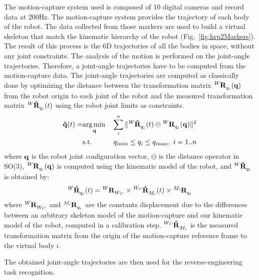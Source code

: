 \documentclass[journal]{IEEEtran}
\begin{document}
The motion-capture system used is composed of 10 digital cameras and record data
at 200Hz.
The motion-capture system provides the trajectory of each body of the robot.
The data collected from those markers
are used to build a virtual skeleton that match the kinematic hierarchy of the robot (Fig.~\ref{fig:hrp2Markers}).
The result of this process is the 6D trajectories of all the bodies in space, without any joint constraints.
\medskip
The analysis of the motion is performed on the joint-angle trajectories.
Therefore, a joint-angle trajectories have to be computed from the motion-capture data.
The joint-angle trajectories are computed as classically done by optimizing the distance
between the transformation matrix $\tensor[^{W}]{\mathbf{R}}{_{q_i}}(\mbf{q})$ from the
robot origin to each joint of the robot and the measured
transformation matrix $\tensor[^{W}]{\mathbf{\hat{R}}}{_{q_i}}(t)$ using the robot joint limits
as constraints.
\begin{eqnarray}
  \mbf{\hat{q}}(t) =  & \underset{\mbf{q}}\argmin & \sum_i^n \Vert \tensor[^{W}]{\mathbf{\hat{R}}}{_{q_i}}(t) \ominus \tensor[^{W}]{\mathbf{R}}{_{q_i}}(\mbf{q}) \Vert ^2\\
    & \text{s.t.} & q_{i\mathrm{min}} \leq q_i \leq q_{i\mathrm{max}}, \; i = 1..n
  \label{mocapOpti}
\end{eqnarray}
where ${\mathbf{q}}$ is the robot joint configuration vector,
$\ominus$ is the distance operator in SO(3),
$\tensor[^{W}]{\mathbf{R}}{_{q_i}}(\mbf{q})$ is computed using the kinematic
model of the robot, and $\tensor[^{W}]{\mathbf{\hat{R}}}{_{q_i}}$ is obtained by:
\begin{equation}
  \tensor[^{W}]{\mathbf{\hat{R}}}{_{q_i}}(t) = \tensor[^{W}]{\mathbf{R}}{_{W_{C}}} \times \tensor[^{W_{C}}]{\mathbf{\hat{R}}}{_{M_i}}(t) \times \tensor[^{M_i}]{\mathbf{R}}{_{q_i}}
  \label{mocapMatrix}
\end{equation}
where $\tensor[^{W}]{\mathbf{R}}{_{W_{C}}}$ and $\tensor[^{M_i}]{\mathbf{R}}{_{q_i}}$ are the constants
displacement due to the differences between an arbitrary skeleton model of the motion-capture and our kinematic model of the robot,
computed in a calibration step.
$\tensor[^{W_{C}}]{\mathbf{\hat{R}}}{_{M_i}}$
is the measured transformation matrix from the origin of the motion-capture reference frame
to the virtual body $i$.

The obtained joint-angle trajectories are then used for the reverse-engineering task recognition.\\
\end{document}
